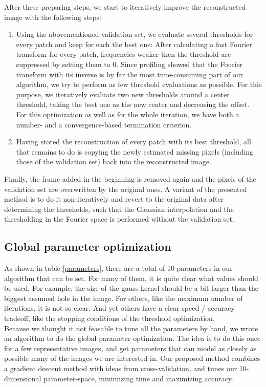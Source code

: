 \documentclass[10pt,conference,compsocconf]{IEEEtran}
\begin{document}
After these preparing steps, we start to iteratively improve the reconstructed image with the following steps:
\begin{enumerate}
\item Using the abovementioned validation set, we evaluate several thresholds for every patch and keep for each the best one: After calculating a fast Fourier transform for every patch, frequencies weaker then the threshold are suppressed by setting them to 0. Since profiling showed that the Fourier transform with its inverse is by far the most time-consuming part of our algorithm, we try to perform as few threshold evaluations as possible. For this purpose, we iteratively evaluate two new thresholds around a center threshold, taking the best one as the new center and decreasing the offset. For this optimization as well as for the whole iteration, we have both a number- and a convergence-based termination criterion.
\item Having stored the reconstruction of every patch with its best threshold, all that remains to do is copying the newly estimated missing pixels (including those of the validation set) back into the reconstructed image.
\end{enumerate}
Finally, the frame added in the beginning is removed again and the pixels of the validation set are overwritten by the original ones. A variant of the presented method is to do it non-iteratively and revert to the original data after determining the thresholds, such that the Gaussian interpolation and the thresholding in the Fourier space is performed without the validation set.

\subsection{Global parameter optimization}
As shown in table \ref{parameters}, there are a total of 10 parameters in our algorithm that can be set. For many of them, it is quite clear what values should be used. For example, the size of the gauss kernel should be a bit larger than the biggest assumed hole in the image. For others, like the maximum number of iterations, it is not so clear. And yet others have a clear speed / accuracy tradeoff, like the stopping conditions of the threshold optimization.\\
Because we thought it not feasable to tune all the parameters by hand, we wrote an algorithm to do the global parameter optimization. The idea is to do this once for a few representative images, and get parameters that can model as closely as possible many of the images we are interested in. Our proposed method combines a gradient descent method with ideas from cross-validation, and tunes our 10-dimensional parameter-space, minimizing time and maximizing accuracy.
\end{document}
